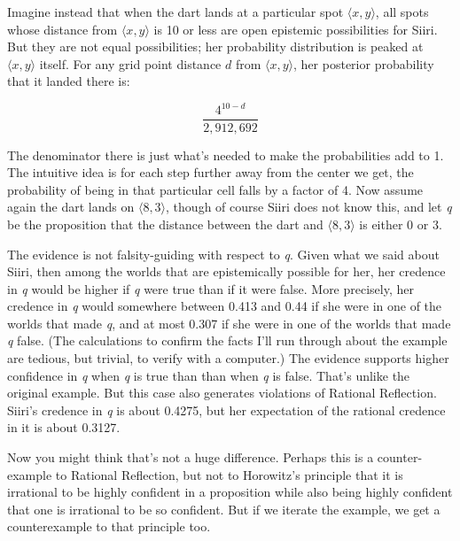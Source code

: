 Imagine instead that when the dart lands at a particular spot $\langle x, y \rangle$, all spots whose distance from $\langle x, y \rangle$ is 10 or less are open epistemic possibilities for \gls{Siiri}. But they are not equal possibilities; her probability distribution is peaked at $\langle x, y \rangle$ itself. For any grid point distance $d$ from $\langle x, y \rangle$, her posterior probability that it landed there is:

\[\frac{4^{10-d}}{2,912,692}\]

\noindent The denominator there is just what's needed to make the probabilities add to 1. The intuitive idea is for each step further away from the center we get, the probability of being in that particular cell falls by a factor of 4. Now assume again the dart lands on $\langle 8, 3 \rangle$, though of course \gls{Siiri} does not know this, and let \emph{q} be the proposition that the distance between the dart and $\langle 8, 3 \rangle$ is either 0 or 3.

The evidence is not falsity-guiding with respect to \emph{q}. Given what we said about \gls{Siiri}, then among the worlds that are epistemically possible for her, her credence in \emph{q} would be higher if \emph{q} were true than if it were false. More precisely, her credence in \emph{q} would somewhere between 0.413 and 0.44 if she were in one of the worlds that made \emph{q}, and at most 0.307 if she were in one of the worlds that made \emph{q} false. (The calculations to confirm the facts I'll run through about the example are tedious, but trivial, to verify with a computer.) The evidence supports higher confidence in \emph{q} when \emph{q} is true than than when \emph{q} is false. That's unlike the original example. But this case also generates violations of Rational Reflection. \gls{Siiri}'s credence in \emph{q} is about 0.4275, but her expectation of the rational credence in it is about 0.3127.

Now you might think that's not a huge difference. Perhaps this is a counter-example to Rational Reflection, but not to Horowitz's principle that it is irrational to be highly confident in a proposition while also being highly confident that one is irrational to be so confident. But if we iterate the example, we get a counterexample to that principle too.


